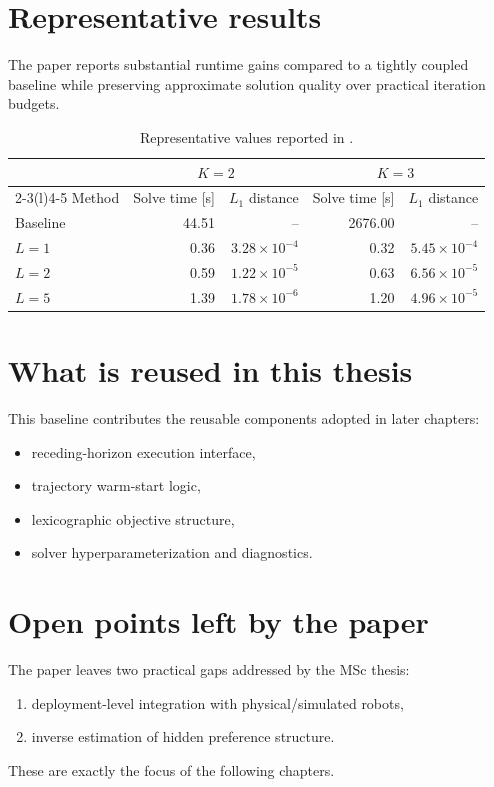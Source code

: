 \section{Representative results}

The paper reports substantial runtime gains compared to a tightly coupled
baseline while preserving approximate solution quality over practical iteration
budgets.

\begin{table}[tbp]
\centering
\caption{Representative values reported in \cite{delasheras:2025}.}
\label{tab:published_runtime}
\begin{tabular}{@{}lrrrr@{}}
\toprule
 & \multicolumn{2}{c}{$K=2$} & \multicolumn{2}{c}{$K=3$} \\
\cmidrule(r){2-3}\cmidrule(l){4-5}
Method & Solve time [s] & $L_1$ distance & Solve time [s] & $L_1$ distance \\
\midrule
Baseline & 44.51 & -- & 2676.00 & -- \\
$L=1$ & 0.36 & $3.28\times10^{-4}$ & 0.32 & $5.45\times10^{-4}$ \\
$L=2$ & 0.59 & $1.22\times10^{-5}$ & 0.63 & $6.56\times10^{-5}$ \\
$L=5$ & 1.39 & $1.78\times10^{-6}$ & 1.20 & $4.96\times10^{-5}$ \\
\bottomrule
\end{tabular}
\end{table}

\section{What is reused in this thesis}

This baseline contributes the reusable components adopted in later chapters:

\begin{itemize}
    \item receding-horizon execution interface,
    \item trajectory warm-start logic,
    \item lexicographic objective structure,
    \item solver hyperparameterization and diagnostics.
\end{itemize}

\section{Open points left by the paper}

The paper leaves two practical gaps addressed by the MSc thesis:

\begin{enumerate}
    \item deployment-level integration with physical/simulated robots,
    \item inverse estimation of hidden preference structure.
\end{enumerate}

These are exactly the focus of the following chapters.
